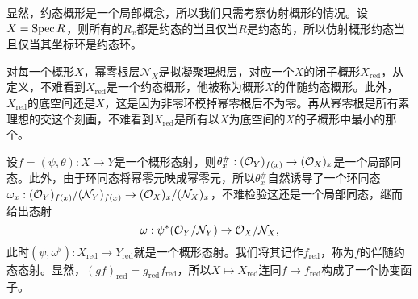 显然，约态概形是一个局部概念，所以我们只需考察仿射概形的情况。设$X=\operatorname{Spec} R$，则所有的$R_x$都是约态的当且仅当$R$是约态的，所以仿射概形约态当且仅当其坐标环是约态环。

对每一个概形$X$，幂零根层$\mathcal N_X$是拟凝聚理想层，对应一个$X$的闭子概形$X_{\text{red}}$，从定义，不难看到$X_{\text{red}}$是一个约态概形，他被称为概形$X$的伴随约态概形。此外，$X_{\text{red}}$的底空间还是$X$，这是因为非零环模掉幂零根后不为零。再从幂零根是所有素理想的交这个刻画，不难看到$X_{\text{red}}$是所有以$X$为底空间的$X$的子概形中最小的那个。

\begin{para}
	设$f=(\psi,\theta):X\to Y$是一个概形态射，则$\theta^\#_x:(\mathcal{O}_Y)_{f(x)}\to (\mathcal{O}_X)_x$是一个局部同态。此外，由于环同态将幂零元映成幂零元，所以$\theta^\#_x$自然诱导了一个环同态$\omega_x:(\mathcal{O}_Y)_{f(x)}/(\mathcal N_Y)_{f(x)}\to (\mathcal{O}_X)_{x}/(\mathcal N_X)_{x}$，不难检验这还是一个局部同态，继而给出态射
	\[
		\omega:\psi^*(\mathcal{O}_Y/\mathcal N_Y)\to \mathcal{O}_X/\mathcal N_X,
	\]
	此时$(\psi,\omega^\flat):X_{\text{red}}\to Y_{\text{red}}$就是一个概形态射。我们将其记作$f_{\text{red}}$，称为$f$的伴随约态态射。显然，$(gf)_{\text{red}}=g_{\text{red}}f_{\text{red}}$，所以$X\mapsto X_{\text{red}}$连同$f\mapsto f_{\text{red}}$构成了一个协变函子。
\end{para}
